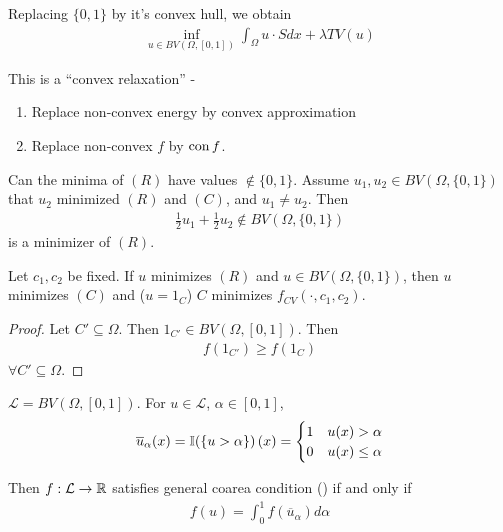 Replacing $\{ 0, 1 \}$ by it's convex hull, we obtain
\begin{align}
  \label{eq:114}
  \tag{$R$}
  \inf_{u \in BV(\Omega, [0, 1])} \int_{\Omega}  u \cdot S dx +
  \lambda TV(u)
\end{align}

This is a ``convex relaxation'' -
\begin{enumerate}
\item Replace non-convex energy by convex approximation
\item Replace non-convex $f$ by $\operatorname*{con} f$.
\end{enumerate}

Can the minima of $(R)$ have values $\notin \{ 0, 1 \}$. Assume
$u_{1}, u_{2} \in BV(\Omega, \{ 0, 1 \})$ that $u_{2}$ minimized $(R)$
and $(C)$, and $u_{1} \neq u_{2}$. Then
\begin{align}
  \label{eq:115}
  \frac{1}{2} u_{1} + \frac{1}{2} u_{2} \notin BV(\Omega, \{ 0, 1 \})
\end{align} is a minimizer of $(R)$.

\begin{proposition}
  Let $c_{1}, c_{2}$ be fixed. If $u$ minimizes $(R)$ and $u \in
  BV(\Omega, \{ 0, 1 \})$, then $u$ minimizes $(C)$ and ($u = 1_{C}$)
  $C$ minimizes $f_{CV}(\cdot, c_{1}, c_{2})$.
\end{proposition}

\begin{proof}
  Let $C' \subseteq \Omega$.  Then $1_{C'} \in BV(\Omega, [0, 1])$.
  Then 
  \begin{align}
    \label{eq:116}
    f(1_{C'}) \geq f(1_{C}) 
  \end{align} $\forall C' \subseteq \Omega$.
\end{proof}

\begin{defn}
  \label{defn:relaxation:3}
  $\mathcal{L} = BV(\Omega, [0, 1])$.  For $u \in \mathcal{L}$,
  $\alpha \in [0, 1]$,
  \begin{align}
    \label{eq:117}
    \overline u_{\alpha}(x) = \I{\{ u > \alpha \}}(x) =
    \begin{cases}
      1 & u(x) > \alpha \\
      0 & u(x) \leq \alpha
    \end{cases}
  \end{align}

  Then $f: \mathcal{L} \rightarrow \mathbb{R}$ satisfies general coarea
  condition (\gcc) if and only if
  \begin{align}
    \label{eq:118}
    f(u) = \int_{0}^{1} f(\overline u_{\alpha}) d\alpha
  \end{align} 
\end{defn}

